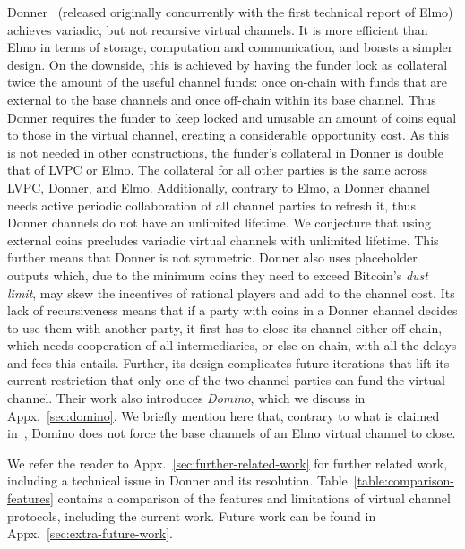   Donner~\cite{donner}
    (released originally concurrently with the first technical report of Elmo) achieves variadic, but not recursive
  virtual channels. It is
  more efficient than Elmo in terms of storage, computation and communication,
  and boasts a simpler design.
  On the downside, this is
  achieved by having the funder lock as
  collateral twice the amount of the useful channel funds: once on-chain with
  funds that are external to the base channels and once off-chain within its base channel. Thus
  Donner requires the funder to keep locked and unusable an amount of coins
  equal to those in the virtual channel, creating a considerable opportunity
  cost. As this is not needed in other
  constructions, the funder's collateral in Donner is double that of LVPC or Elmo. The
  collateral for all other parties is the same
  across LVPC, Donner, and Elmo.
  Additionally, contrary to Elmo, a Donner channel needs active periodic
  collaboration of all channel parties to refresh
  it, thus Donner channels do not have an unlimited
  lifetime. We conjecture that using external coins precludes variadic
  virtual channels with unlimited lifetime. This
  further means that Donner is not symmetric. Donner also uses
  placeholder outputs which, due to the minimum coins they need to
  exceed Bitcoin's \emph{dust limit}, may skew the incentives of rational players
  and add to the channel
  cost. Its lack of recursiveness means that if a party with coins in a
  Donner channel decides to use them with another party, it first has to close
  its channel either off-chain, which needs cooperation of all intermediaries, or
  else on-chain, with all the delays and fees this entails.
  Further, its design complicates
  future iterations that lift its current restriction that only one of the two
  channel parties can fund the virtual channel.
  Their work also introduces \emph{Domino},
  which we discuss
  in Appx.~\ref{sec:domino}.
  We briefly mention
  here that, contrary to what is claimed in~\cite{donner}, Domino does not force
  the base channels of an Elmo virtual channel to close.

  We refer the reader
  to Appx.~\ref{sec:further-related-work}
  for further
  related work, including a technical issue in Donner and its resolution.
  Table~\ref{table:comparison-features} contains a comparison of the
  features and limitations of virtual channel protocols, including the current
  work. Future work can be found
  in Appx.~\ref{sec:extra-future-work}.
